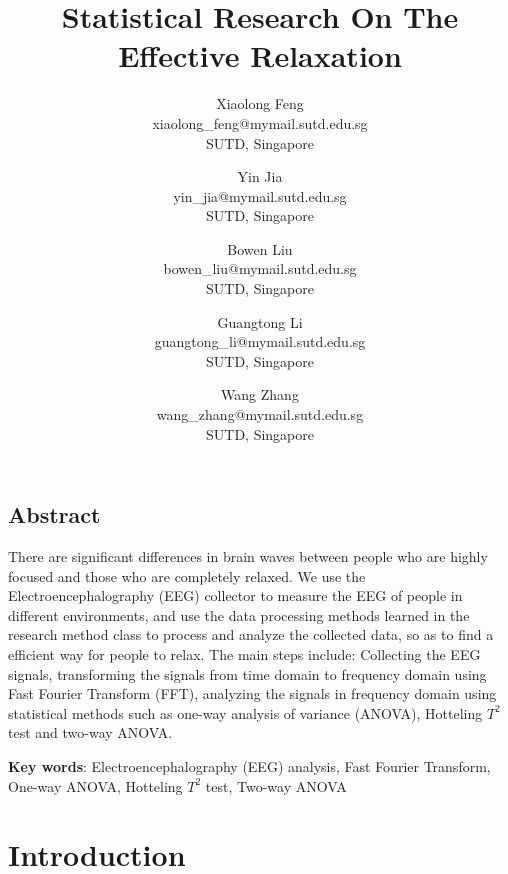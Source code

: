 \documentclass[letterpaper,twocolumn,10pt]{article}
\begin{document}
\date{}

\title{\Large \bf Statistical Research On The Effective Relaxation}

\author{
{\rm Xiaolong Feng}\\
xiaolong\_feng@mymail.sutd.edu.sg\\
SUTD, Singapore
\and
{\rm Yin Jia}\\
yin\_jia@mymail.sutd.edu.sg\\
SUTD, Singapore
\and
{\rm Bowen Liu}\\
bowen\_liu@mymail.sutd.edu.sg\\
SUTD, Singapore
\and
{\rm Guangtong Li}\\
guangtong\_li@mymail.sutd.edu.sg\\
SUTD, Singapore
\and
{\rm Wang Zhang}\\
wang\_zhang@mymail.sutd.edu.sg\\
SUTD, Singapore
} 

\maketitle

\thispagestyle{empty}

\subsection*{Abstract}
There are significant differences in brain waves between people who are highly focused and those who are completely relaxed. We use the Electroencephalography (EEG) collector to measure the EEG of people in different environments, and use the data processing methods learned in the research method class to process and analyze the collected data, so as to find a efficient way for people to relax. The main steps include: Collecting the EEG signals, transforming the signals from time domain to frequency domain using Fast Fourier Transform (FFT), analyzing the signals in frequency domain using statistical methods such as one-way analysis of variance (ANOVA), Hotteling $T^2$ test and two-way ANOVA.


\textbf{Key words}: Electroencephalography (EEG) analysis, Fast Fourier Transform, One-way ANOVA, Hotteling $T^2$ test, Two-way ANOVA


\section{Introduction}
\end{document}
